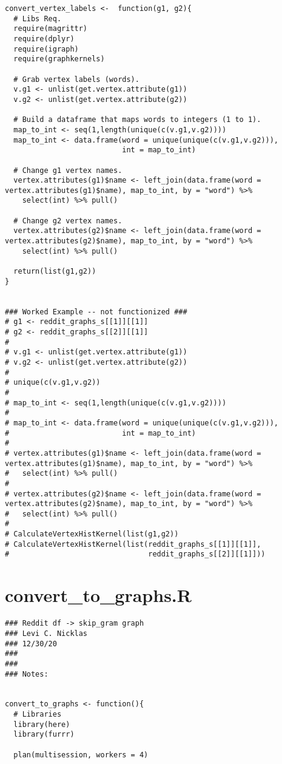 \begin{appendices}
\begin{lstlisting}
convert_vertex_labels <-  function(g1, g2){
  # Libs Req.
  require(magrittr)
  require(dplyr)
  require(igraph)
  require(graphkernels)
  
  # Grab vertex labels (words).
  v.g1 <- unlist(get.vertex.attribute(g1))
  v.g2 <- unlist(get.vertex.attribute(g2))
  
  # Build a dataframe that maps words to integers (1 to 1).
  map_to_int <- seq(1,length(unique(c(v.g1,v.g2))))
  map_to_int <- data.frame(word = unique(unique(c(v.g1,v.g2))),
                           int = map_to_int)
  
  # Change g1 vertex names.
  vertex.attributes(g1)$name <- left_join(data.frame(word = vertex.attributes(g1)$name), map_to_int, by = "word") %>% 
    select(int) %>% pull()
  
  # Change g2 vertex names.
  vertex.attributes(g2)$name <- left_join(data.frame(word = vertex.attributes(g2)$name), map_to_int, by = "word") %>% 
    select(int) %>% pull()
  
  return(list(g1,g2))
}


### Worked Example -- not functionized ###
# g1 <- reddit_graphs_s[[1]][[1]]
# g2 <- reddit_graphs_s[[2]][[1]]
# 
# v.g1 <- unlist(get.vertex.attribute(g1))
# v.g2 <- unlist(get.vertex.attribute(g2))
# 
# unique(c(v.g1,v.g2))
# 
# map_to_int <- seq(1,length(unique(c(v.g1,v.g2))))
# 
# map_to_int <- data.frame(word = unique(unique(c(v.g1,v.g2))),
#                          int = map_to_int)
# 
# vertex.attributes(g1)$name <- left_join(data.frame(word = vertex.attributes(g1)$name), map_to_int, by = "word") %>% 
#   select(int) %>% pull()
# 
# vertex.attributes(g2)$name <- left_join(data.frame(word = vertex.attributes(g2)$name), map_to_int, by = "word") %>% 
#   select(int) %>% pull()
# 
# CalculateVertexHistKernel(list(g1,g2))
# CalculateVertexHistKernel(list(reddit_graphs_s[[1]][[1]],
#                                reddit_graphs_s[[2]][[1]]))
\end{lstlisting}

\section{convert\_to\_graphs.R}
\begin{lstlisting}
### Reddit df -> skip_gram graph
### Levi C. Nicklas
### 12/30/20
###
###
### Notes:  


convert_to_graphs <- function(){
  # Libraries
  library(here)
  library(furrr)
  
  plan(multisession, workers = 4)
  

\end{lstlisting}
\end{appendices}
